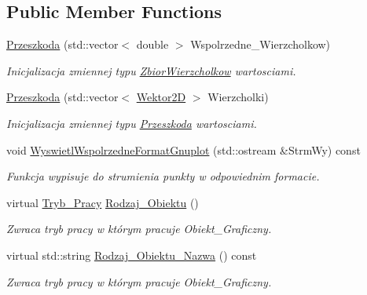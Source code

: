 \subsection*{Public Member Functions}
\begin{DoxyCompactItemize}
\item 
\hyperlink{class_przeszkoda_a303469102fbcb1ba755a1ce21843dbc1}{Przeszkoda} (std\+::vector$<$ double $>$ Wspolrzedne\+\_\+\+Wierzcholkow)
\begin{DoxyCompactList}\small\item\em Inicjalizacja zmiennej typu \hyperlink{class_zbior_wierzcholkow}{Zbior\+Wierzcholkow} wartosciami. \end{DoxyCompactList}\item 
\hyperlink{class_przeszkoda_a480189fb4902d0a8687d1c74e02700a5}{Przeszkoda} (std\+::vector$<$ \hyperlink{class_wektor2_d}{Wektor2\+D} $>$ Wierzcholki)
\begin{DoxyCompactList}\small\item\em Inicjalizacja zmiennej typu \hyperlink{class_przeszkoda}{Przeszkoda} wartosciami. \end{DoxyCompactList}\item 
\hypertarget{class_przeszkoda_a9efe723c0ba4bce1b63afef72f0c5b4c}{void \hyperlink{class_przeszkoda_a9efe723c0ba4bce1b63afef72f0c5b4c}{Wyswietl\+Wspolrzedne\+Format\+Gnuplot} (std\+::ostream \&Strm\+Wy) const }\label{class_przeszkoda_a9efe723c0ba4bce1b63afef72f0c5b4c}

\begin{DoxyCompactList}\small\item\em Funkcja wypisuje do strumienia punkty w odpowiednim formacie. \end{DoxyCompactList}\item 
\hypertarget{class_przeszkoda_a7c9bc76e1b1eb807db884844765ba977}{virtual \hyperlink{_objekt___graficzny_8hh_a59b4a471a7481f2a0551d90a8a745c9f}{Tryb\+\_\+\+Pracy} \hyperlink{class_przeszkoda_a7c9bc76e1b1eb807db884844765ba977}{Rodzaj\+\_\+\+Obiektu} ()}\label{class_przeszkoda_a7c9bc76e1b1eb807db884844765ba977}

\begin{DoxyCompactList}\small\item\em Zwraca tryb pracy w którym pracuje Obiekt\+\_\+\+Graficzny. \end{DoxyCompactList}\item 
\hypertarget{class_przeszkoda_a74db2c6d7b6e9efd173b2d2a12a3249d}{virtual std\+::string \hyperlink{class_przeszkoda_a74db2c6d7b6e9efd173b2d2a12a3249d}{Rodzaj\+\_\+\+Obiektu\+\_\+\+Nazwa} () const }\label{class_przeszkoda_a74db2c6d7b6e9efd173b2d2a12a3249d}

\begin{DoxyCompactList}\small\item\em Zwraca tryb pracy w którym pracuje Obiekt\+\_\+\+Graficzny. \end{DoxyCompactList}\end{DoxyCompactItemize}
